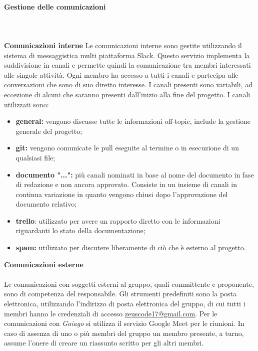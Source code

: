 			\paragraph{Gestione delle comunicazioni} \mbox{}\\ \mbox{}\\
			\textbf{Comunicazioni interne} \newline \newline
			Le comunicazioni interne sono gestite utilizzando il sistema di messaggistica multi piattaforma Slack\glo. Questo servizio implementa la suddivisione in canali e permette quindi la comunicazione tra membri interessati alle singole attività. Ogni membro ha accesso a tutti i canali e partecipa alle conversazioni che sono di suo diretto interesse. I canali presenti sono variabili, ad eccezione di alcuni che saranno presenti dall'inizio alla fine del progetto.
			I canali utilizzati sono:
			\begin{itemize}
				\item \textbf{general:} vengono discusse tutte le informazioni off-topic\glo, include la gestione generale del progetto;
				\item \textbf{git:} vengono comunicate le pull eseguite al termine o in esecuzione di un qualsiasi file;
				\item \textbf{documento "...":} più canali nominati in base al nome del documento in fase di redazione e non ancora approvato. Consiste in un insieme di canali in continua variazione in quanto vengono chiusi dopo l'approvazione del documento relativo;
				\item \textbf{trello}: utilizzato per avere un rapporto diretto con le informazioni riguardanti lo stato della documentazione;
				\item \textbf{spam:} utilizzato per discutere liberamente di ciò che è esterno al progetto.
			\end{itemize}
			\textbf{Comunicazioni esterne} \mbox{}\\ \mbox{}\\
			Le comunicazioni con soggetti esterni al gruppo, quali committente e proponente, sono di competenza del responsabile. Gli strumenti predefiniti sono la posta elettronica, utilizzando l'indirizzo di posta elettronica del gruppo, di cui tutti i membri hanno le credenziali di accesso  \url{zeuscode17@gmail.com}.
			Per le comunicazioni con \textit{Gaiago} si utilizza il servizio Google Meet per le riunioni. In caso di assenza di uno o più membri del gruppo un membro presente, a turno, assume l'onere di creare un riassunto scritto per gli altri membri.
			\newline
